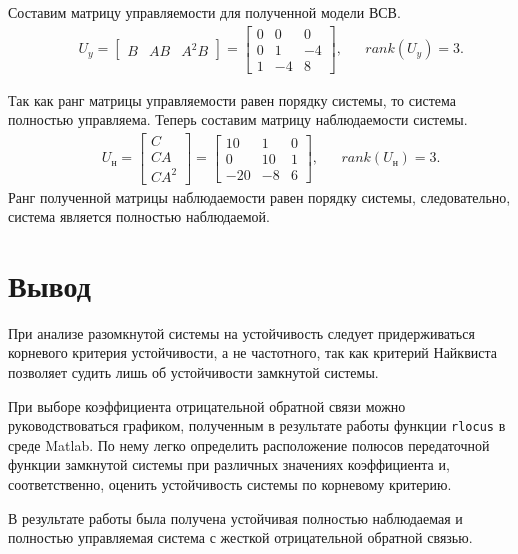 \documentclass[fleqn, a4paper, 11pt, russian]{article}
\begin{document}
	Составим матрицу управляемости для полученной модели ВСВ.
	\begin{align}
		&&U_y = \begin{bmatrix}
			B	&	AB	&	A^2B
		\end{bmatrix} = \begin{bmatrix}
			0	&	0	&	0	\\
			0	&	1	&	-4	\\
			1	&	-4	&	8
		\end{bmatrix}, &&rank(U_y) = 3.
	\end{align}
	
	Так как ранг матрицы управляемости равен порядку системы, то система полностью управляема. Теперь составим матрицу наблюдаемости системы.
	\begin{align}
		&&U_\text{н} = \begin{bmatrix}
			C\\
			CA\\
			CA^2
		\end{bmatrix} = \begin{bmatrix}
			10	&	1	&	0	\\
			0	&	10	&	1	\\
			-20	&	-8	&	6
		\end{bmatrix}, &&rank(U_\text{н}) = 3.
	\end{align}
	Ранг полученной матрицы наблюдаемости равен порядку системы, следовательно, система является полностью наблюдаемой.
	\clearpage
	\section*{Вывод}
	При анализе разомкнутой системы на устойчивость следует придерживаться корневого критерия устойчивости, а не частотного, так как критерий Найквиста позволяет судить лишь об устойчивости замкнутой системы.
	
	При выборе коэффициента отрицательной обратной связи можно руководствоваться графиком, полученным в результате работы функции \texttt{rlocus} в среде Matlab. По нему легко определить расположение полюсов передаточной функции замкнутой системы при различных значениях коэффициента и, соответственно, оценить устойчивость системы по корневому критерию.
	
	В результате работы была получена устойчивая полностью наблюдаемая и полностью управляемая система с жесткой отрицательной обратной связью.
\end{document}
